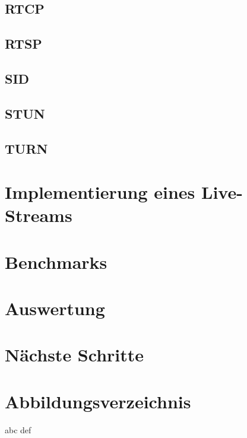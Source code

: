 \documentclass[journal]{IEEEtran}
\begin{document}
\subsection{RTCP}
\lipsum[1-4][1-10]
\subsection{RTSP}
\lipsum[1-3][3-30]
\subsection{SID}
\lipsum[1-2][2-3]
\subsection{STUN}
\lipsum[1-4][1-10]
\subsection{TURN}
\lipsum[1-2][2-3]

\section{Implementierung eines Live-Streams}
\lipsum[1-2][2-3]
\section{Benchmarks}
\lipsum[1-4][1-10]
\section{Auswertung}
\lipsum[1-2][2-3]

\section{Nächste Schritte}

\lipsum

\section{Abbildungsverzeichnis}
abc
def



\end{document}
